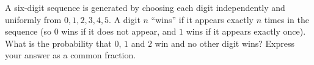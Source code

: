 A six-digit sequence is generated by choosing each digit independently and uniformly from $0,1,2,3,4,5$. A digit $n$ ``wins'' if it appears exactly $n$ times in the sequence (so $0$ wins if it does not appear, and $1$ wins if it appears exactly once). What is the probability that $0$, $1$ and $2$ win and no other digit wins? Express your answer as a common fraction.
